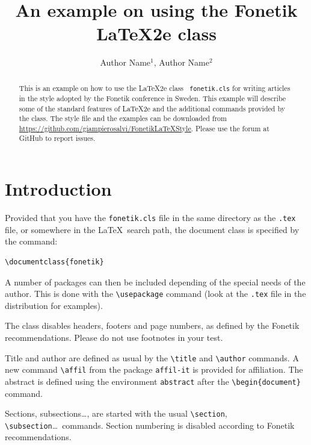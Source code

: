 \documentclass{fonetik}
\title{An example on using the Fonetik \LaTeX2e class}
\author{Author Name$^1$, Author Name$^2$}
\affil{$^1$KTH Royal Institute of Technology,\\
  $^2$Department, University, Country\\
  \normalfont\texttt{author@kth.se, author@dept.uni.co}
}
\begin{document}
\maketitle

\begin{abstract}
This is an example on how to use the \LaTeX2e class {\tt
  fonetik.cls} for writing articles in the style adopted by the Fonetik
conference in Sweden. This example will describe some of the standard features
of \LaTeX2e and the additional commands provided by the class.
The style file and the examples can be downloaded from \url{https://github.com/giampierosalvi/FonetikLaTeXStyle}. Please use the forum at GitHub to report issues.
\end{abstract}

\section{Introduction}
Provided that you have the \verb|fonetik.cls| file in the same directory
as the \verb|.tex| file, or somewhere in the \LaTeX\ search path, the
document class is specified by the command:
\begin{verbatim}
\documentclass{fonetik}
\end{verbatim}

A number of packages can then be included depending of the special
needs of the author. This is done with the \verb|\usepackage| command
(look at the \verb|.tex| file in the distribution for examples).

The class disables headers, footers and page numbers, as defined by the
Fonetik recommendations. Please do not use footnotes in your test.

Title and author are defined as usual by the \verb|\title| and
\verb|\author| commands. A new command \verb|\affil| from the package
\verb|affil-it| is provided for affiliation. The abstract is defined using
the environment \verb|abstract| after the \verb|\begin{document}|
command.

Sections, subsections\ldots, are started with the usual
\verb|\section|, \verb|\subsection|\ldots\ commands. Section numbering is
disabled according to Fonetik recommendations.
\end{document}
